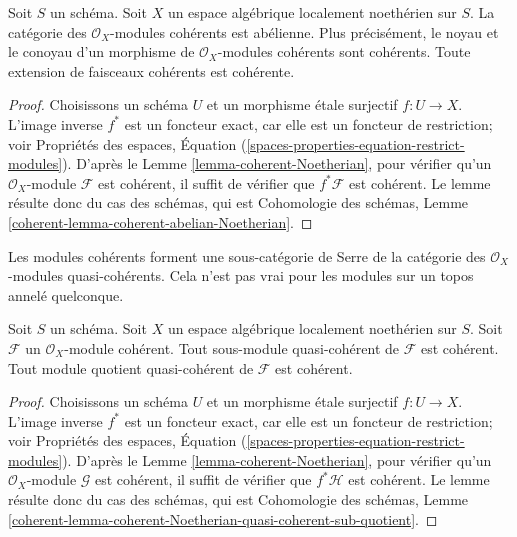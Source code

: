 \begin{lemma}
\label{lemma-coherent-abelian-Noetherian}
Soit $S$ un schéma. Soit $X$ un espace algébrique localement noethérien sur $S$.
La catégorie des $\mathcal{O}_X$-modules cohérents est abélienne. Plus précisément,
le noyau et le conoyau d'un morphisme de $\mathcal{O}_X$-modules cohérents sont
cohérents. Toute extension de faisceaux cohérents est cohérente.
\end{lemma}

\begin{proof}
Choisissons un schéma $U$ et un morphisme \'etale surjectif $f : U \to X$.
L'image inverse $f^*$ est un foncteur exact, car elle est un foncteur de restriction; voir
Propriétés des espaces, Équation
(\ref{spaces-properties-equation-restrict-modules}).
D'après le
Lemme \ref{lemma-coherent-Noetherian}, pour vérifier qu'un
$\mathcal{O}_X$-module $\mathcal{F}$ est
cohérent, il suffit de vérifier que $f^*\mathcal{F}$ est cohérent. Le
lemme résulte donc du cas des schémas, qui est
Cohomologie des schémas, Lemme \ref{coherent-lemma-coherent-abelian-Noetherian}.
\end{proof}

\noindent
Les modules cohérents forment une sous-catégorie de Serre de la
catégorie des $\mathcal{O}_X$-modules quasi-cohérents. Cela n'est pas vrai
pour les modules sur un topos annelé quelconque.

\begin{lemma}
\label{lemma-coherent-Noetherian-quasi-coherent-sub-quotient}
Soit $S$ un schéma.
Soit $X$ un espace algébrique localement noethérien sur $S$.
Soit $\mathcal{F}$ un $\mathcal{O}_X$-module cohérent.
Tout sous-module quasi-cohérent de $\mathcal{F}$ est cohérent.
Tout module quotient quasi-cohérent de $\mathcal{F}$ est cohérent.
\end{lemma}

\begin{proof}
Choisissons un schéma $U$ et un morphisme \'etale surjectif $f : U \to X$.
L'image inverse $f^*$ est un foncteur exact, car elle est un foncteur de restriction; voir
Propriétés des espaces, Équation
(\ref{spaces-properties-equation-restrict-modules}).
D'après le
Lemme \ref{lemma-coherent-Noetherian}, pour vérifier qu'un
$\mathcal{O}_X$-module $\mathcal{G}$ est
cohérent, il suffit de vérifier que $f^*\mathcal{H}$ est cohérent. Le
lemme résulte donc du cas des schémas, qui est
Cohomologie des schémas, Lemme
\ref{coherent-lemma-coherent-Noetherian-quasi-coherent-sub-quotient}.
\end{proof}

